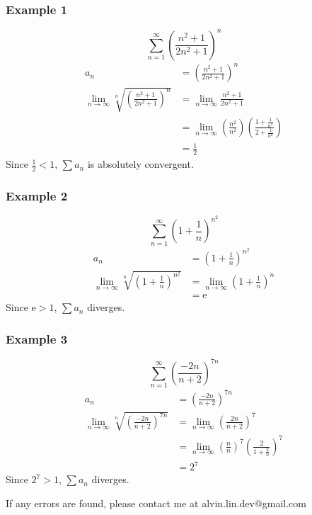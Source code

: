\documentclass[letterpaper, 12pt]{article}
\newcommand*{\e}{\mathrm{e}}
\begin{document}
\subsubsection*{Example 1}
\[ \sum_{n=1}^{\infty}(\frac{n^{2}+1}{2n^{2}+1})^{n} \]
\begin{align*}
  a_{n} &= (\frac{n^{2}+1}{2n^{2}+1})^{n} \\
  \lim_{n\to\infty}\sqrt[n]{(\frac{n^{2}+1}{2n^{2}+1})^{n}} &=
    \lim_{n\to\infty}\frac{n^{2}+1}{2n^{2}+1} \\
  &= \lim_{n\to\infty}
    (\frac{n^{2}}{n^{2}})(\frac{1+\frac{1}{n^{2}}}{2+\frac{1}{n^{2}}}) \\
  &= \frac{1}{2}
\end{align*}
Since \( \frac{1}{2} < 1 \), \( \sum{a_{n}} \) is absolutely convergent.

\subsubsection*{Example 2}
\[ \sum_{n=1}^{\infty}(1+\frac{1}{n})^{n^{2}} \]
\begin{align*}
  a_{n} &= (1+\frac{1}{n})^{n^{2}} \\
  \lim_{n\to\infty}\sqrt[n]{(1+\frac{1}{n})^{n^{2}}} &=
    \lim_{n\to\infty}(1+\frac{1}{n})^{n} \\
  &= \e
\end{align*}
Since \( \e > 1 \), \( \sum{a_{n}} \) diverges.

\subsubsection*{Example 3}
\[ \sum_{n=1}^{\infty}(\frac{-2n}{n+2})^{7n} \]
\begin{align*}
  a_{n} &= (\frac{-2n}{n+2})^{7n} \\
  \lim_{n\to\infty}\sqrt[n]{(\frac{-2n}{n+2})^{7n}} &=
    \lim_{n\to\infty}(\frac{2n}{n+2})^{7} \\
  &= \lim_{n\to\infty}(\frac{n}{n})^{7}(\frac{2}{1+\frac{2}{n}})^{7} \\
  &= 2^{7}
\end{align*}
Since \( 2^{7} > 1 \), \( \sum{a_{n}} \) diverges.

\begin{center}
  If any errors are found, please contact me at alvin.lin.dev@gmail.com
\end{center}
\end{document}
